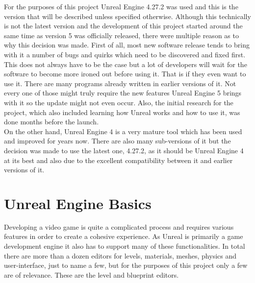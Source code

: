 For the purposes of this project Unreal Engine 4.27.2 was used and this is the version that will be described unless specified otherwise. Although this technically is not the latest version and the development of this project started around the same time as version 5 was officially released, there were multiple reason as to why this decision was made. First of all, most new software release tends to bring with it a number of bugs and quirks which need to be discovered and fixed first. This does not always have to be the case but a lot of developers will wait for the software to become more ironed out before using it. That is if they even want to use it. There are many programs already written in earlier versions of it. Not every one of those might truly require the new features Unreal Engine 5 brings with it so the update might not even occur. Also, the initial research for the project, which also included learning how Unreal works and how to use it, was done months before the launch.\\ 
On the other hand, Unreal Engine 4 is a very mature tool which has been used and improved for years now. There are also many sub-versions of it but the decision was made to use the latest one, 4.27.2, as it should be Unreal Engine 4 at its best and also due to the excellent compatibility between it and earlier versions of it.

\section{Unreal Engine Basics}\label{sec:Grundlage1}
Developing a video game is quite a complicated process and requires various features in order to create a cohesive experience. As Unreal is primarily a game development engine it also has to support many of these functionalities. In total there are more than a dozen editors for levels, materials, meshes, physics and user-interface\cite{bib:UEEditors}, just to name a few, but for the purposes of this project only a few are of relevance. These are the level and blueprint editors.\\

